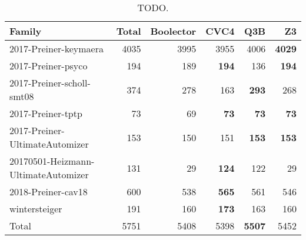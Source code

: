 \begin{table}[ht]
\centering
\begin{tabular}{lrrrrr}
  \toprule
Family & Total & Boolector & CVC4 & Q3B & Z3 \\ 
  \midrule
2017-Preiner-keymaera & 4035 & 3995 & 3955 & 4006 & \textbf{4029} \\ 
  2017-Preiner-psyco & 194 & 189 & \textbf{194} & 136 & \textbf{194} \\ 
  2017-Preiner-scholl-smt08 & 374 & 278 & 163 & \textbf{293} & 268 \\ 
  2017-Preiner-tptp &  73 &  69 & \textbf{73} & \textbf{73} & \textbf{73} \\ 
  2017-Preiner-UltimateAutomizer & 153 & 150 & 151 & \textbf{153} & \textbf{153} \\ 
  20170501-Heizmann-UltimateAutomizer & 131 &  29 & \textbf{124} & 122 & 29 \\ 
  2018-Preiner-cav18 & 600 & 538 & \textbf{565} & 561 & 546 \\ 
  wintersteiger & 191 & 160 & \textbf{173} & 163 & 160 \\ 
   \midrule
Total & 5751 & 5408 & 5398 & \textbf{5507} & 5452 \\ 
   \bottomrule
\end{tabular}
\caption{TODO.} 
\end{table}
